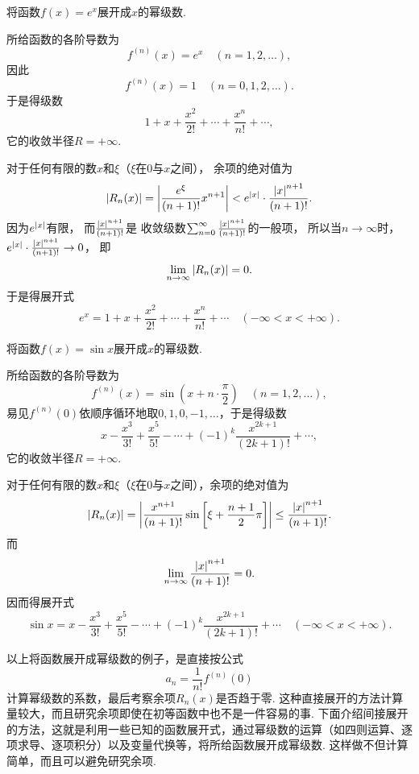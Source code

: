 \begin{example}
将函数\(f(x) = e^x\)展开成\(x\)的幂级数.
\begin{solution}
所给函数的各阶导数为\[
	f^{(n)}(x) = e^x
	\quad(n=1,2,\dotsc),
\]
因此\[
	f^{(n)}(x) = 1
	\quad(n=0,1,2,\dotsc).
\]
于是得级数\[
	1+x+\frac{x^2}{2!}+\dotsb+\frac{x^n}{n!}+\dotsb,
\]它的收敛半径\(R = +\infty\).

对于任何有限的数\(x\)和\(\xi\)（\(\xi\)在\(0\)与\(x\)之间），
余项的绝对值为\[
	\abs{R_n(x)} = \abs{\frac{e^{\xi}}{(n+1)!} x^{n+1}}
	< e^{\abs{x}} \cdot \frac{\abs{x}^{n+1}}{(n+1)!}.
\]
因为\(e^{\abs{x}}\)有限，
而\(\frac{\abs{x}^{n+1}}{(n+1)!}\)是
收敛级数\(\sum_{n=0}^\infty \frac{\abs{x}^{n+1}}{(n+1)!}\)的一般项，
所以当\(n\to\infty\)时，\(e^{\abs{x}} \cdot \frac{\abs{x}^{n+1}}{(n+1)!}\to0\)，
即\[
	\lim_{n\to\infty} \abs{R_n(x)} = 0.
\]
于是得展开式\[
	e^x = 1+x+\frac{x^2}{2!}+\dotsb+\frac{x^n}{n!}+\dotsb
	\quad(-\infty<x<+\infty).
\]
\end{solution}
\end{example}

\begin{example}
将函数\(f(x) = \sin x\)展开成\(x\)的幂级数.
\begin{solution}
所给函数的各阶导数为\[
	f^{(n)}(x) = \sin\left(x + n\cdot\frac{\pi}{2}\right)
	\quad(n=1,2,\dotsc),
\]
易见\(f^{(n)}(0)\)依顺序循环地取\(0,1,0,-1,\dotsc\)，于是得级数\[
	x-\frac{x^3}{3!}+\frac{x^5}{5!}-\dotsb+(-1)^k \frac{x^{2k+1}}{(2k+1)!}+\dotsb,
\]
它的收敛半径\(R=+\infty\).

对于任何有限的数\(x\)和\(\xi\)（\(\xi\)在\(0\)与\(x\)之间），余项的绝对值为\[
	\abs{R_n(x)}
	= \abs{ \frac{x^{n+1}}{(n+1)!} \sin\left[\xi+\frac{n+1}{2}\pi\right] }
	\leq \frac{\abs{x}^{n+1}}{(n+1)!}.
\]
而\[
	\lim_{n\to\infty} \frac{\abs{x}^{n+1}}{(n+1)!} = 0.
\]
因而得展开式\[
	\sin x = x-\frac{x^3}{3!}+\frac{x^5}{5!}-\dotsb+(-1)^k \frac{x^{2k+1}}{(2k+1)!}+\dotsb
	\quad(-\infty<x<+\infty).
\]
\end{solution}
\end{example}

以上将函数展开成幂级数的例子，是直接按公式\[
a_n = \frac{1}{n!} f^{(n)}(0)
\]计算幂级数的系数，最后考察余项\(R_n(x)\)是否趋于零.
这种直接展开的方法计算量较大，而且研究余项即使在初等函数中也不是一件容易的事.
下面介绍间接展开的方法，这就是利用一些已知的函数展开式，通过幂级数的运算（如四则运算、逐项求导、逐项积分）以及变量代换等，将所给函数展开成幂级数.
这样做不但计算简单，而且可以避免研究余项.

